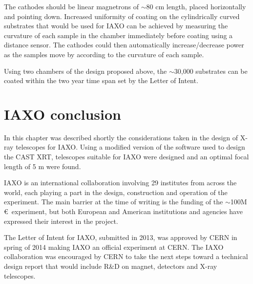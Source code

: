 The cathodes should be linear magnetrons of $\sim$80 cm length, placed horizontally and pointing down. Increased uniformity of coating on the cylindrically curved substrates that would be used for IAXO can be achieved by measuring the curvature of each sample in the chamber immediately before coating using a distance sensor. The cathodes could then automatically increase/decrease power as the samples move by according to the curvature of each sample.

Using two chambers of the design proposed above, the $\sim$30,000 substrates can be coated within the two year time span set by the Letter of Intent.

\section{IAXO conclusion}
In this chapter was described shortly the considerations taken in the design of X-ray telescopes for IAXO. Using a modified version of the software used to design the CAST XRT, telescopes suitable for IAXO were designed and an optimal focal length of 5 m were found.

IAXO is an international collaboration involving 29 institutes from across the world, each playing a part in the design, construction and operation of the experiment. The main barrier at the time of writing is the funding of the $\sim$100M \euro\ experiment, but both European and American institutions and agencies have expressed their interest in the project.

The Letter of Intent for IAXO, submitted in 2013, was approved by CERN in spring of 2014 making IAXO an official experiment at CERN. The IAXO collaboration was encouraged by CERN to take the next steps toward a technical design report that would include R\&D on magnet, detectors and X-ray telescopes.
